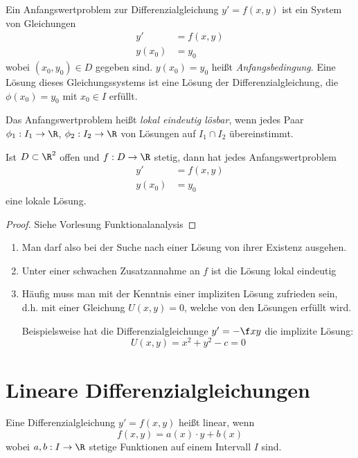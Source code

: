 \documentclass[a4paper,10pt]{scrbook}
\begin{document}
Ein Anfangswertproblem zur Differenzialgleichung $y'=f(x,y)$ ist ein System von Gleichungen
\begin{align*}
	y' &= f(x,y)\\
y(x_0) &= y_0
\end{align*}
wobei $(x_0,y_0)\in D$ gegeben sind.
$y(x_0) = y_0$ heißt \emph{Anfangsbedingung}.
Eine Lösung dieses Gleichungssystems ist eine Lösung der Differenzialgleichung, die $\phi(x_0)=y_0$ mit $x_0\in I$ erfüllt.

Das Anfangswertproblem heißt \emph{lokal eindeutig lösbar}, wenn jedes Paar $\phi_1 : I_1 \to \R$, $\phi_2 : I_2 \to \R$ von Lösungen auf $I_1\cap I_2$ übereinstimmt.

\begin{thm}[Peano]
	Ist $D\subset \R^2$ offen und $f:D\to \R$ stetig, dann hat jedes Anfangswertproblem
	\begin{align*}
		y' &= f(x,y)\\
	y(x_0) &= y_0
	\end{align*}
	eine lokale Lösung.
	\begin{proof}
		Siehe Vorlesung Funktionalanalysis
	\end{proof}
	\begin{note}
		\begin{enumerate}[1)]
			\item
				Man darf also bei der Suche nach einer Lösung von ihrer Existenz ausgehen.
			\item
				Unter einer schwachen Zusatzannahme an $f$ ist die Lösung lokal eindeutig
			\item
				Häufig muss man mit der Kenntnis einer impliziten Lösung zufrieden sein, d.h. mit einer Gleichung $U(x,y) = 0$, welche von den Lösungen erfüllt wird.

				Beispielsweise hat die Differenzialgleichunge $y'= - \f xy$ die implizite Lösung:
				\[
					U(x,y) = x^2 + y^2 - c = 0
				\]
		\end{enumerate}
	\end{note}
\end{thm}


\section{Lineare Differenzialgleichungen}

\begin{df*}
	Eine Differenzialgleichung $y' = f(x,y)$ heißt linear, wenn
	\[
		f(x,y) = a(x)\cdot y + b(x)
	\]
	wobei $a,b: I \to \R$ stetige Funktionen auf einem Intervall $I$ sind.
\end{df*}
\end{document}
